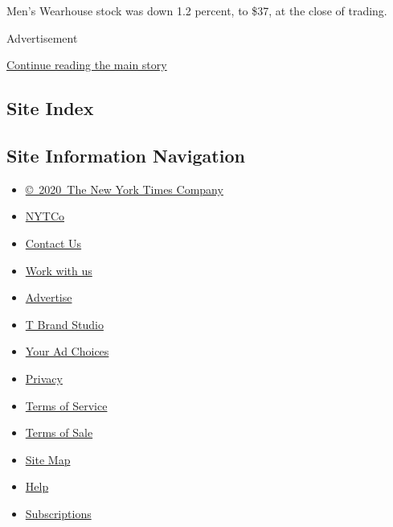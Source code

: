 Men's Wearhouse stock was down 1.2 percent, to \$37, at the close of
trading.

Advertisement

\protect\hyperlink{after-bottom}{Continue reading the main story}

\hypertarget{site-index}{%
\subsection{Site Index}\label{site-index}}

\hypertarget{site-information-navigation}{%
\subsection{Site Information
Navigation}\label{site-information-navigation}}

\begin{itemize}
\tightlist
\item
  \href{https://help.nytimes3xbfgragh.onion/hc/en-us/articles/115014792127-Copyright-notice}{©~2020~The
  New York Times Company}
\end{itemize}

\begin{itemize}
\tightlist
\item
  \href{https://www.nytco.com/}{NYTCo}
\item
  \href{https://help.nytimes3xbfgragh.onion/hc/en-us/articles/115015385887-Contact-Us}{Contact
  Us}
\item
  \href{https://www.nytco.com/careers/}{Work with us}
\item
  \href{https://nytmediakit.com/}{Advertise}
\item
  \href{http://www.tbrandstudio.com/}{T Brand Studio}
\item
  \href{https://www.nytimes3xbfgragh.onion/privacy/cookie-policy\#how-do-i-manage-trackers}{Your
  Ad Choices}
\item
  \href{https://www.nytimes3xbfgragh.onion/privacy}{Privacy}
\item
  \href{https://help.nytimes3xbfgragh.onion/hc/en-us/articles/115014893428-Terms-of-service}{Terms
  of Service}
\item
  \href{https://help.nytimes3xbfgragh.onion/hc/en-us/articles/115014893968-Terms-of-sale}{Terms
  of Sale}
\item
  \href{https://spiderbites.nytimes3xbfgragh.onion}{Site Map}
\item
  \href{https://help.nytimes3xbfgragh.onion/hc/en-us}{Help}
\item
  \href{https://www.nytimes3xbfgragh.onion/subscription?campaignId=37WXW}{Subscriptions}
\end{itemize}
